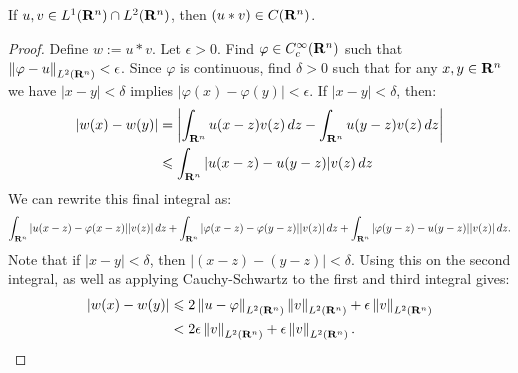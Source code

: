 \begin{lemma}
	If $u,v \in L^1(\mathbf{R}^n) \cap L^2(\mathbf{R}^n)$, then $(u \ast v) \in C(\mathbf{R}^n)$.
\end{lemma}
	\begin{proof}
		Define $w:=u \ast v$. Let $\epsilon > 0$. Find $\varphi \in C^\infty_c(\mathbf{R}^n)$ such that $\left\lVert \varphi - u \right\rVert_{L^2(\mathbf{R}^n)} < \epsilon$. Since $\varphi$ is continuous, find $\delta > 0$ such that for any $x,y \in \mathbf{R}^n$ we have $|x-y| < \delta$ implies $|\varphi(x) - \varphi(y)| < \epsilon$. If $|x-y| < \delta$, then:
		\begin{align*}
			|w(x) - w(y)|
			&= \left| \int_{\mathbf{R}^n}^{}u(x-z)v(z)\,dz - \int_{\mathbf{R}^n}^{} u(y-z)v(z)\,dz  \right|  \\
			&\leqslant \int_{\mathbf{R}^n}^{} |u(x-z) - u(y-z)|v(z)\,dz \\
		\end{align*}
		We can rewrite this final integral as:
		\[
			\int_{\mathbf{R}^n}^{} |u(x-z)-\varphi(x-z)||v(z)|\,dz + \int_{\mathbf{R}^n}^{} |\varphi(x-z) - \varphi(y-z)||v(z)|\,dz + \int_{\mathbf{R}^n}^{} |\varphi(y-z) - u(y-z)||v(z)|\,dz.	
		\] 
		Note that if $|x-y| < \delta$, then $|(x-z) - (y-z)| < \delta$. Using this on the second integral, as well as applying Cauchy-Schwartz to the first and third integral gives:
		\begin{align*}
			|w(x) - w(y)|
			&\leqslant 2\left\lVert u - \varphi \right\rVert_{L^2(\mathbf{R}^n)}\left\lVert v \right\rVert_{L^2(\mathbf{R}^n)} + \epsilon \left\lVert v \right\rVert_{L^2(\mathbf{R}^n)} \\
			& < 2\epsilon \left\lVert v \right\rVert_{L^2(\mathbf{R}^n)} + \epsilon \left\lVert v \right\rVert_{L^2(\mathbf{R}^n)}. \qedhere
		\end{align*}
	\end{proof}


